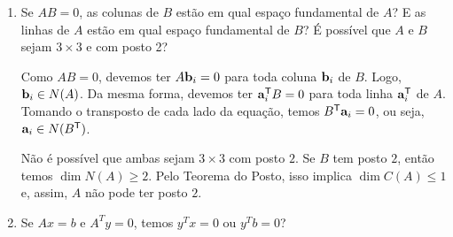 \documentclass[leqno]{article}
\begin{document}
\date{\today}

\maketitle

\begin{enumerate}


\item Se $AB = 0$, as colunas de $B$ estão em qual espaço fundamental de $A$? E as linhas de $A$ estão em qual espaço fundamental de $B$? É possível que $A$ e $B$ sejam $3 \times 3$ e com posto 2?

\begin{sol} 

    Como \( AB = 0 \), devemos ter \( A\mathbf{b}_{ i } = 0 \) para toda coluna \( \mathbf{b}_{ i } \) de \( B \).
    Logo, \( \mathbf{b}_{ i } \in N ( A ) \).
    Da mesma forma, devemos ter \( \mathbf{a}^{ \mathsf{T} }_{ i } B = 0 \) para toda linha \( \mathbf{a}_{ i }^{ \mathsf{T} } \) de \( A \).
    Tomando o transposto de cada lado da equação, temos \( B^{ \mathsf{T} } \mathbf{a}_{ i } = 0 \), ou seja, \( \mathbf{a}_{ i } \in N ( B^{ \mathsf{T} } ) \).

    Não é possível que ambas sejam \( 3 \times 3 \) com posto \( 2 \).
    Se \( B \) tem posto \( 2 \), então temos \( \dim N ( A ) \geq 2 \).
    Pelo Teorema do Posto, isso implica \( \dim C ( A ) \leq 1 \) e, assim, \( A \) não pode ter posto \( 2 \).

\end{sol} 



\item Se $Ax = b$ e $A^Ty = 0$, temos $y^Tx = 0$ ou $y^Tb=0$?

\begin{sol} 
    

\end{sol}
\end{enumerate}
\end{document}
